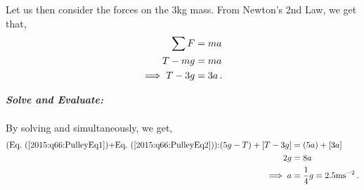 \begin{subquestions}
	Let us then consider the forces on the 3kg mass. From Newton's 2nd Law, we get that,
	\begin{align}
		\sum F & = ma \nonumber \\
		T-mg & = ma \nonumber \\
		\implies T-3g & = 3a \,. \label{2015:q66:PulleyEq2}
	\end{align}
	
	
	
	
	\textbf{\textit{Solve and Evaluate:}} \\ \\
	By solving  and  simultaneously, we get,
	\begin{align}
		\text{(\req{2015:q66:PulleyEq1}+\req{2015:q66:PulleyEq2}):} (5g-T)+[T-3g] & = (5a)+[3a] \nn \\
		2g & = 8a \nn \\
		\implies a & = \frac{1}{4}g = 2.5\text{ms}^{-2} \,.
	\end{align}
	
	
	
	
\end{subquestions}
